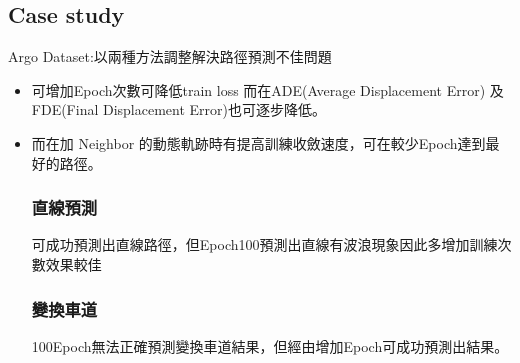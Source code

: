\documentclass{article}
\begin{document}
\subsection{Case study}
Argo Dataset:以兩種方法調整解決路徑預測不佳問題
\begin{itemize}
	\item 可增加Epoch次數可降低train loss 而在ADE(Average Displacement Error) 及 FDE(Final Displacement Error)也可逐步降低。
	\item 而在加 Neighbor 的動態軌跡時有提高訓練收斂速度，可在較少Epoch達到最好的路徑。

\subsubsection{直線預測}
可成功預測出直線路徑，但Epoch100預測出直線有波浪現象因此多增加訓練次數效果較佳
\begin{figure}[H]
	\centering
\end{figure}

\subsubsection{變換車道}
100Epoch無法正確預測變換車道結果，但經由增加Epoch可成功預測出結果。
\begin{figure}[H]
	\centering
\end{figure}


\end{itemize}
\end{document}
